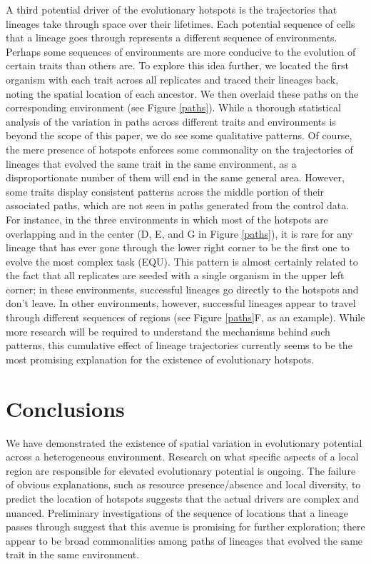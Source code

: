 A third potential driver of the evolutionary hotspots is the trajectories that lineages take through space over their lifetimes. Each potential sequence of cells that a lineage goes through represents a different sequence of environments. Perhaps some sequences of environments are more conducive to the evolution of certain traits than others are. To explore this idea further, we located the first organism with each trait across all replicates and traced their lineages back, noting the spatial location of each ancestor. We then overlaid these paths on the corresponding environment (see Figure \ref{paths}). While a thorough statistical analysis of the variation in paths across different traits and environments is beyond the scope of this paper, we do see some qualitative patterns. Of course, the mere presence of hotspots enforces some commonality on the trajectories of lineages that evolved the same trait in the same environment, as a disproportionate number of them will end in the same general area. However, some traits display consistent patterns across the middle portion of their associated paths, which are not seen in paths generated from the control data. For instance, in the three environments in which most of the hotspots are overlapping and in the center (D, E, and G in Figure \ref{paths}), it is rare for any lineage that has ever gone through the lower right corner to be the first one to evolve the most complex task (EQU). This pattern is almost certainly related to the fact that all replicates are seeded with a single organism in the upper left corner; in these environments, successful lineages go directly to the hotspots and don't leave. In other environments, however, successful lineages appear to travel through different sequences of regions (see Figure \ref{paths}F, as an example). While more research will be required to understand the mechanisms behind such patterns, this cumulative effect of lineage trajectories currently seems to be the most promising explanation for the existence of evolutionary hotspots.


\section{Conclusions}
    We have demonstrated the existence of spatial variation in evolutionary potential across a heterogeneous environment. Research on what specific aspects of a local region are responsible for elevated evolutionary potential is ongoing. The failure of obvious explanations, such as resource presence/absence and local diversity, to predict the location of hotspots suggests that the actual drivers are complex and nuanced. Preliminary investigations of the sequence of locations that a lineage passes through suggest that this avenue is promising for further exploration; there appear to be broad commonalities among paths of lineages that evolved the same trait in the same environment.
 
